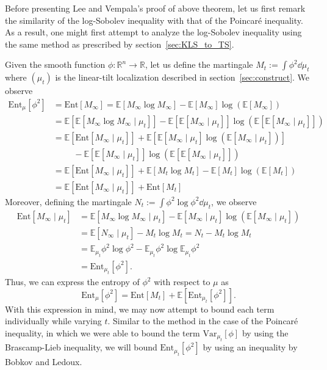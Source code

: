 Before presenting Lee and Vempala's proof of above theorem, let us first remark the similarity of the 
log-Sobolev inequality with that of the Poincaré inequality. As a result, one might first attempt to analyze 
the log-Sobolev inequality using the same method as prescribed by section~\ref{sec:KLS_to_TS}. 

Given the smooth function \(\phi : \mathbb{R}^n \to \mathbb{R}\), let us define the martingale 
\(M_t := \int \phi^2 \dd \mu_t\) where \((\mu_t)\) is the linear-tilt localization described in section~\ref{sec:construct}. 
We observe
\begin{align*}
  \text{Ent}_\mu[\phi^2] & = \text{Ent}[M_\infty] 
    = \mathbb{E}[M_\infty \log M_\infty] - \mathbb{E}[M_\infty]\log(\mathbb{E}[M_\infty]) \\
  & = \mathbb{E}[\mathbb{E}[M_\infty \log M_\infty \mid \mu_t]] 
      - \mathbb{E}[\mathbb{E}[M_\infty \mid \mu_t]]\log(\mathbb{E}[\mathbb{E}[M_\infty \mid \mu_t]]) \\
  & = \mathbb{E}[\text{Ent}[M_\infty \mid \mu_t]] + \mathbb{E}[\mathbb{E}[M_\infty \mid \mu_t]\log(\mathbb{E}[M_\infty \mid \mu_t])]\\ 
  & \hspace{1cm} - \mathbb{E}[\mathbb{E}[M_\infty \mid \mu_t]]\log(\mathbb{E}[\mathbb{E}[M_\infty \mid \mu_t]])\\
  & = \mathbb{E}[\text{Ent}[M_\infty \mid \mu_t]] + \mathbb{E}[M_t \log M_t] - \mathbb{E}[M_t]\log(\mathbb{E}[M_t])\\
  & = \mathbb{E}[\text{Ent}[M_\infty \mid \mu_t]] + \text{Ent}[M_t]
\end{align*}
Moreover, defining the martingale \(N_t := \int \phi^2\log \phi^2 \dd \mu_t\), we observe
\begin{align*}
  \text{Ent}[M_\infty \mid \mu_t] 
  & = \mathbb{E}[M_\infty \log M_\infty \mid \mu_t] - \mathbb{E}[M_\infty \mid \mu_t]\log(\mathbb{E}[M_\infty \mid \mu_t]) \\
  & = \mathbb{E}[N_\infty \mid \mu_t] - M_t \log M_t = N_t - M_t \log M_t\\
  & = \mathbb{E}_{\mu_t}{\phi^2 \log \phi^2} - \mathbb{E}_{\mu_t}{\phi^2} \log \mathbb{E}_{\mu_t}{\phi^2} \\
  & = \text{Ent}_{\mu_t}[\phi^2].
\end{align*}
Thus, we can express the entropy of \(\phi^2\) with respect to \(\mu\) as 
\begin{equation}
  \text{Ent}_\mu[\phi^2] = \text{Ent}[M_t] + \mathbb{E}[\text{Ent}_{\mu_t}[\phi^2]].
\end{equation}
With this expression in mind, we may now attempt to bound each term individually while 
varying \(t\). Similar to the method in the case of the Poincaré inequality, in which we were able to bound the term 
\(\text{Var}_{\mu_t}[\phi]\) by using the Brascamp-Lieb inequality, we will bound \(\text{Ent}_{\mu_t}[\phi^2]\) 
by using an inequality by Bobkov and Ledoux.


